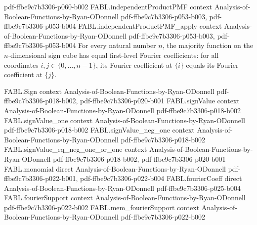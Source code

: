 \begin{theorem}
  {pdf-ffbe9c7b3306-p060-b002}
\proofstep
  {FABL.independentProductPMF}
  {context}
  {Analysis-of-Boolean-Functions-by-Ryan-ODonnell}
  {pdf-ffbe9c7b3306-p053-b003,
    pdf-ffbe9c7b3306-p053-b004}
\proofstep
  {FABL.independentProductPMF_apply}
  {context}
  {Analysis-of-Boolean-Functions-by-Ryan-ODonnell}
  {pdf-ffbe9c7b3306-p053-b003,
    pdf-ffbe9c7b3306-p053-b004}
For every natural number $n$, the majority function on the $n$-dimensional sign cube has
equal first-level Fourier coefficients: for all coordinates $i,j\in\{0,\ldots,n-1\}$,
its Fourier coefficient at $\{i\}$ equals its Fourier coefficient at $\{j\}$.
\end{theorem}

\begin{theorem}
\label{FABL.fourierCoeff_singleton_le_majority_of_equal}
\leanok
{}
\proofstep
  {FABL.Sign}
  {context}
  {Analysis-of-Boolean-Functions-by-Ryan-ODonnell}
  {pdf-ffbe9c7b3306-p018-b002,
    pdf-ffbe9c7b3306-p020-b001}
\proofstep
  {FABL.signValue}
  {context}
  {Analysis-of-Boolean-Functions-by-Ryan-ODonnell}
  {pdf-ffbe9c7b3306-p018-b002}
\proofstep
  {FABL.signValue_one}
  {context}
  {Analysis-of-Boolean-Functions-by-Ryan-ODonnell}
  {pdf-ffbe9c7b3306-p018-b002}
\proofstep
  {FABL.signValue_neg_one}
  {context}
  {Analysis-of-Boolean-Functions-by-Ryan-ODonnell}
  {pdf-ffbe9c7b3306-p018-b002}
\proofstep
  {FABL.signValue_eq_neg_one_or_one}
  {context}
  {Analysis-of-Boolean-Functions-by-Ryan-ODonnell}
  {pdf-ffbe9c7b3306-p018-b002,
    pdf-ffbe9c7b3306-p020-b001}
\proofstep
  {FABL.monomial}
  {direct}
  {Analysis-of-Boolean-Functions-by-Ryan-ODonnell}
  {pdf-ffbe9c7b3306-p022-b001,
    pdf-ffbe9c7b3306-p022-b004}
\proofstep
  {FABL.fourierCoeff}
  {direct}
  {Analysis-of-Boolean-Functions-by-Ryan-ODonnell}
  {pdf-ffbe9c7b3306-p025-b004}
\proofstep
  {FABL.fourierSupport}
  {context}
  {Analysis-of-Boolean-Functions-by-Ryan-ODonnell}
  {pdf-ffbe9c7b3306-p022-b002}
\proofstep
  {FABL.mem_fourierSupport}
  {context}
  {Analysis-of-Boolean-Functions-by-Ryan-ODonnell}
  {pdf-ffbe9c7b3306-p022-b002}
\proofstep

\end{theorem}
